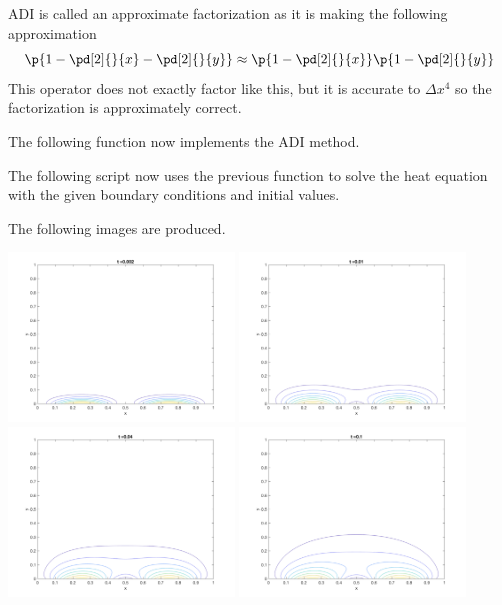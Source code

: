 \documentclass[11pt, oneside]{article}
\begin{document}
\begin{enumerate}
    ADI is called an approximate factorization as it is making the following
    approximation
    \[
      \p{1 - \pd[2]{}{x} - \pd[2]{}{y}} \approx \p{1 - \pd[2]{}{x}}\p{1 - \pd[2]{}{y}}
    \]
    This operator does not exactly factor like this, but it is accurate to $\Delta x^4$
    so the factorization is approximately correct.

    The following function now implements the ADI method.
    
    The following script now uses the previous function to solve the heat
    equation with the given boundary conditions and initial values.
    
    The following images are produced.
    \begin{center}
      \includegraphics[width=0.45\textwidth]{Figures/04_03.png}
      \includegraphics[width=0.45\textwidth]{Figures/04_04.png}
      \includegraphics[width=0.45\textwidth]{Figures/04_05.png}
      \includegraphics[width=0.45\textwidth]{Figures/04_06.png}

\end{center}
\end{enumerate}
\end{document}
